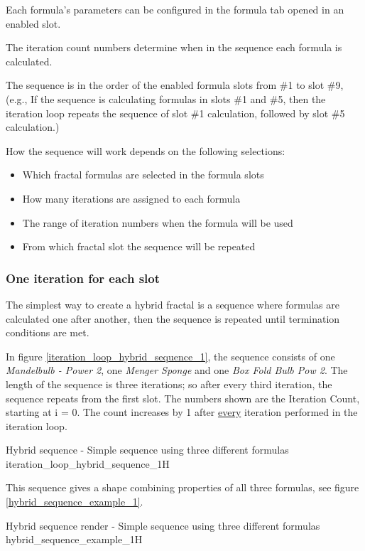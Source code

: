 Each formula's parameters can be configured in the formula tab opened in an enabled slot.

The iteration count numbers determine when in the sequence each formula is calculated.

The sequence is in the order of the enabled formula slots from \#1 to slot \#9, (e.g., If the sequence is calculating formulas in slots
\#1 and \#5, then the iteration loop repeats the sequence of slot \#1 calculation, followed by slot
\#5 calculation.)

How the sequence will work depends on the following selections:
\begin{itemize}
	\item Which fractal formulas are selected in the formula slots
	\item How many iterations are assigned to each formula
	\item The range of iteration numbers when the formula will be used
	\item From which fractal slot the sequence will be repeated
\end{itemize}

\subsubsection{One iteration for each slot}

The simplest way to create a hybrid fractal is a sequence where formulas are calculated one after another, then the sequence is repeated until termination conditions are met.

In figure \ref{iteration_loop_hybrid_sequence_1}, the sequence consists of one \emph{Mandelbulb - Power 2}, one \emph{Menger Sponge} and
one \emph{Box Fold Bulb Pow 2}. The length of the sequence is three iterations; so after every third iteration, the sequence repeats from the first slot. The numbers shown are the Iteration Count, starting at i = 0. The count increases by 1 after \underline{every} iteration performed in the iteration loop.

{Hybrid sequence - Simple sequence using three different formulas}
{iteration_loop_hybrid_sequence_1}{H}

This sequence gives a shape combining properties of all three
formulas, see figure \ref{hybrid_sequence_example_1}.

{Hybrid sequence render - Simple sequence using three different formulas}
{hybrid_sequence_example_1}{H}

